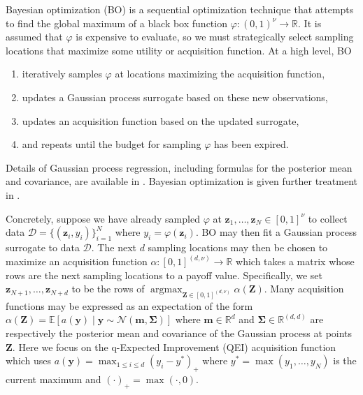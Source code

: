 \documentclass[graybox]{svmult}
\begin{document}
Bayesian optimization (BO) is a sequential optimization technique that attempts to find the global maximum of a black box function $\varphi: (0,1)^{\nu} \to \mathbb{R}$. It is assumed that $\varphi$ is expensive to evaluate, so we must strategically select sampling locations that maximize some utility or acquisition function. At a high level, BO 
\begin{enumerate}
    \item iteratively samples $\varphi$ at locations maximizing the acquisition function,
    \item updates a Gaussian process surrogate based on these new observations,
    \item updates an acquisition function based on the updated surrogate,
    \item and repeats until the budget for sampling $\varphi$ has been expired.
\end{enumerate}
Details of Gaussian process regression, including formulas for the posterior mean and covariance, are available in \cite{rasmussen2006gaussian}. Bayesian optimization is given further treatment in \cite{snoek2012practical}.

Concretely, suppose we have already sampled $\varphi$ at $\boldsymbol{z}_1,\dots,\boldsymbol{z}_{N} \in [0,1]^{\nu}$ to collect data $\mathcal{D}=\{(\boldsymbol{z}_i,y_i)\}_{i=1}^N$ where $y_i = \varphi(\boldsymbol{z}_i)$. BO may then fit a Gaussian process surrogate to data $\mathcal{D}$. The next $d$ sampling locations may then be chosen to maximize an acquisition function $\alpha: [0,1]^{(d,\nu)} \to \mathbb{R}$ which takes a matrix whose rows are the next sampling locations to a payoff value. Specifically, we set $\boldsymbol{z}_{N+1}, \dots, \boldsymbol{z}_{N+d}$ to be the rows of $\mathop{\text{argmax}}_{\boldsymbol{Z} \in [0,1]^{(d,\nu)}}\alpha(\boldsymbol{Z})$. Many acquisition functions may be expressed as an expectation of the form $\alpha(\boldsymbol{Z}) = \mathbb{E}\left[a(\boldsymbol{y}) \mid \boldsymbol{y} \sim \mathcal{N}\left(\boldsymbol{m},\boldsymbol{\Sigma}\right)\right]$ where $\boldsymbol{m} \in \mathbb{R}^{d}$ and  $\boldsymbol{\Sigma} \in \mathbb{R}^{(d,d)}$ are respectively the posterior mean and covariance of the Gaussian process at points $\boldsymbol{Z}$. Here we focus on the q-Expected Improvement (QEI) acquisition function which uses $a(\boldsymbol{y}) = \max_{1 \leq i \leq d} (y_i - y^*)_+$ where $y^*= \max\left(y_1,\dots,y_N\right)$ is the current maximum and $(\cdot)_+ = \max(\cdot,0)$. 
\end{document}
